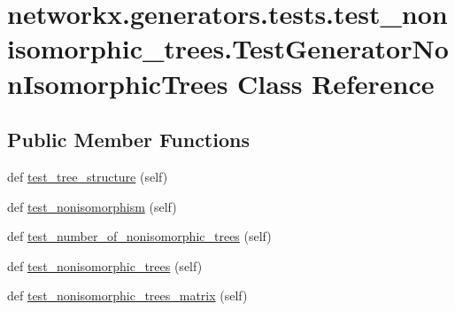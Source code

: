 \hypertarget{classnetworkx_1_1generators_1_1tests_1_1test__nonisomorphic__trees_1_1TestGeneratorNonIsomorphicTrees}{}\section{networkx.\+generators.\+tests.\+test\+\_\+nonisomorphic\+\_\+trees.\+Test\+Generator\+Non\+Isomorphic\+Trees Class Reference}
\label{classnetworkx_1_1generators_1_1tests_1_1test__nonisomorphic__trees_1_1TestGeneratorNonIsomorphicTrees}
\subsection*{Public Member Functions}
\begin{DoxyCompactItemize}
\item 
def \hyperlink{classnetworkx_1_1generators_1_1tests_1_1test__nonisomorphic__trees_1_1TestGeneratorNonIsomorphicTrees_af25306b2e1411c8a23470c064145f217}{test\+\_\+tree\+\_\+structure} (self)
\item 
def \hyperlink{classnetworkx_1_1generators_1_1tests_1_1test__nonisomorphic__trees_1_1TestGeneratorNonIsomorphicTrees_ad8a12afb1119f86f0fe7c58f3a883d84}{test\+\_\+nonisomorphism} (self)
\item 
def \hyperlink{classnetworkx_1_1generators_1_1tests_1_1test__nonisomorphic__trees_1_1TestGeneratorNonIsomorphicTrees_a64d4a88ad03c14661415290ed683310c}{test\+\_\+number\+\_\+of\+\_\+nonisomorphic\+\_\+trees} (self)
\item 
def \hyperlink{classnetworkx_1_1generators_1_1tests_1_1test__nonisomorphic__trees_1_1TestGeneratorNonIsomorphicTrees_acb85206f476969627739ae3924412023}{test\+\_\+nonisomorphic\+\_\+trees} (self)
\item 
def \hyperlink{classnetworkx_1_1generators_1_1tests_1_1test__nonisomorphic__trees_1_1TestGeneratorNonIsomorphicTrees_ae9a86763f67b795c405d76cb7e561175}{test\+\_\+nonisomorphic\+\_\+trees\+\_\+matrix} (self)
\end{DoxyCompactItemize}


